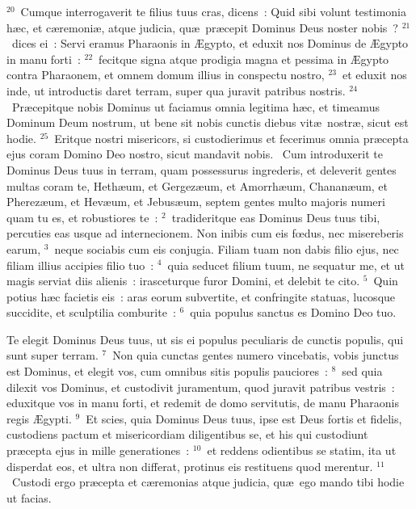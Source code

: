 ${}^{20}$~Cumque interrogaverit te filius tuus cras, dicens~: Quid sibi volunt testimonia h\ae c, et c\ae remoni\ae , atque judicia, qu\ae\ pr\ae cepit Dominus Deus noster nobis~?
${}^{21}$~dices ei~: Servi eramus Pharaonis in \AE gypto, et eduxit nos Dominus de \AE gypto in manu forti~:
${}^{22}$~fecitque signa atque prodigia magna et pessima in \AE gypto contra Pharaonem, et omnem domum illius in conspectu nostro,
${}^{23}$~et eduxit nos inde, ut introductis daret terram, super qua juravit patribus nostris.
${}^{24}$~Pr\ae cepitque nobis Dominus ut faciamus omnia legitima h\ae c, et timeamus Dominum Deum nostrum, ut bene sit nobis cunctis diebus vit\ae\ nostr\ae , sicut est hodie.
${}^{25}$~Eritque nostri misericors, si custodierimus et fecerimus omnia pr\ae cepta ejus coram Domino Deo nostro, sicut mandavit nobis.
~\lettrine[lines=10,image=true,loversize=0.05,lraise=-0.03]{C}{}um introduxerit te Dominus Deus tuus in terram, quam possessurus ingrederis, et deleverit gentes multas coram te, Heth\ae um, et Gergez\ae um, et Amorrh\ae um, Chanan\ae um, et Pherez\ae um, et Hev\ae um, et Jebus\ae um, septem gentes multo majoris numeri quam tu es, et robustiores te~:
${}^{2}$~tradideritque eas Dominus Deus tuus tibi, percuties eas usque ad internecionem. Non inibis cum eis fœdus, nec misereberis earum,
${}^{3}$~neque sociabis cum eis conjugia. Filiam tuam non dabis filio ejus, nec filiam illius accipies filio tuo~:
${}^{4}$~quia seducet filium tuum, ne sequatur me, et ut magis serviat diis alienis~: irasceturque furor Domini, et delebit te cito.
${}^{5}$~Quin potius h\ae c facietis eis~: aras eorum subvertite, et confringite statuas, lucosque succidite, et sculptilia comburite~:
${}^{6}$~quia populus sanctus es Domino Deo tuo.

 Te elegit Dominus Deus tuus, ut sis ei populus peculiaris de cunctis populis, qui sunt super terram.
${}^{7}$~Non quia cunctas gentes numero vincebatis, vobis junctus est Dominus, et elegit vos, cum omnibus sitis populis pauciores~:
${}^{8}$~sed quia dilexit vos Dominus, et custodivit juramentum, quod juravit patribus vestris~: eduxitque vos in manu forti, et redemit de domo servitutis, de manu Pharaonis regis \AE gypti.
${}^{9}$~Et scies, quia Dominus Deus tuus, ipse est Deus fortis et fidelis, custodiens pactum et misericordiam diligentibus se, et his qui custodiunt pr\ae cepta ejus in mille generationes~:
${}^{10}$~et reddens odientibus se statim, ita ut disperdat eos, et ultra non differat, protinus eis restituens quod merentur.
${}^{11}$~Custodi ergo pr\ae cepta et c\ae remonias atque judicia, qu\ae\ ego mando tibi hodie ut facias.


